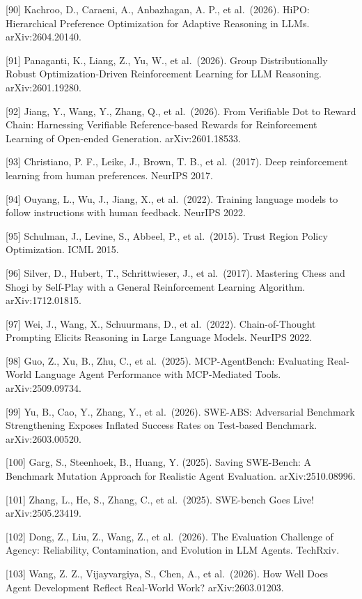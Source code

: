 {[}90{]} Kachroo, D., Caraeni, A., Anbazhagan, A. P., et al.~(2026). HiPO: Hierarchical Preference Optimization for Adaptive Reasoning in LLMs. arXiv:2604.20140.

{[}91{]} Panaganti, K., Liang, Z., Yu, W., et al.~(2026). Group Distributionally Robust Optimization-Driven Reinforcement Learning for LLM Reasoning. arXiv:2601.19280.

{[}92{]} Jiang, Y., Wang, Y., Zhang, Q., et al.~(2026). From Verifiable Dot to Reward Chain: Harnessing Verifiable Reference-based Rewards for Reinforcement Learning of Open-ended Generation. arXiv:2601.18533.

{[}93{]} Christiano, P. F., Leike, J., Brown, T. B., et al.~(2017). Deep reinforcement learning from human preferences. NeurIPS 2017.

{[}94{]} Ouyang, L., Wu, J., Jiang, X., et al.~(2022). Training language models to follow instructions with human feedback. NeurIPS 2022.

{[}95{]} Schulman, J., Levine, S., Abbeel, P., et al.~(2015). Trust Region Policy Optimization. ICML 2015.

{[}96{]} Silver, D., Hubert, T., Schrittwieser, J., et al.~(2017). Mastering Chess and Shogi by Self-Play with a General Reinforcement Learning Algorithm. arXiv:1712.01815.

{[}97{]} Wei, J., Wang, X., Schuurmans, D., et al.~(2022). Chain-of-Thought Prompting Elicits Reasoning in Large Language Models. NeurIPS 2022.

{[}98{]} Guo, Z., Xu, B., Zhu, C., et al.~(2025). MCP-AgentBench: Evaluating Real-World Language Agent Performance with MCP-Mediated Tools. arXiv:2509.09734.

{[}99{]} Yu, B., Cao, Y., Zhang, Y., et al.~(2026). SWE-ABS: Adversarial Benchmark Strengthening Exposes Inflated Success Rates on Test-based Benchmark. arXiv:2603.00520.

{[}100{]} Garg, S., Steenhoek, B., Huang, Y. (2025). Saving SWE-Bench: A Benchmark Mutation Approach for Realistic Agent Evaluation. arXiv:2510.08996.

{[}101{]} Zhang, L., He, S., Zhang, C., et al.~(2025). SWE-bench Goes Live! arXiv:2505.23419.

{[}102{]} Dong, Z., Liu, Z., Wang, Z., et al.~(2026). The Evaluation Challenge of Agency: Reliability, Contamination, and Evolution in LLM Agents. TechRxiv.

{[}103{]} Wang, Z. Z., Vijayvargiya, S., Chen, A., et al.~(2026). How Well Does Agent Development Reflect Real-World Work? arXiv:2603.01203.

